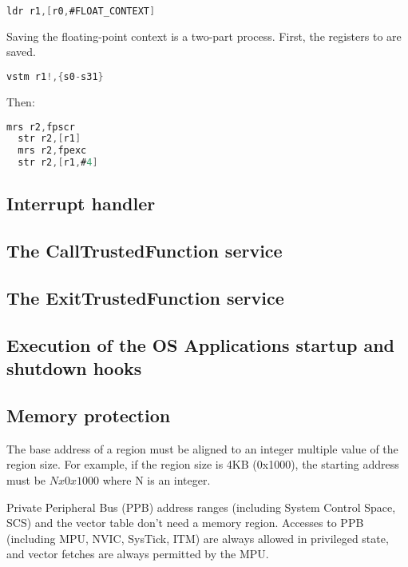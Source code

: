\begin{lstlisting}[language=C]
  ldr r1,[r0,#FLOAT_CONTEXT]
\end{lstlisting}

Saving the floating-point context is a two-part process. First, the registers  to  are saved.


\begin{lstlisting}[language=C]
  vstm r1!,{s0-s31}
\end{lstlisting}

Then:

\begin{lstlisting}[language=C]
  mrs r2,fpscr
  str r2,[r1]
  mrs r2,fpexc
  str r2,[r1,#4]
\end{lstlisting}



\subsection{Interrupt handler}

\subsection{The CallTrustedFunction service}
\subsection{The ExitTrustedFunction service}
\subsection{Execution of the OS Applications startup and shutdown hooks}
\subsection{Memory protection}

The base address of a region must be aligned to an integer multiple value of the region size.
For example, if the region size is 4KB (0x1000), the starting address must be $N x 0x1000$ where N is an integer.

Private Peripheral Bus (PPB) address ranges (including System Control Space, SCS) and the vector table don't need a memory region.
Accesses to PPB (including MPU, NVIC, SysTick, ITM) are always allowed in privileged state, and vector fetches are always permitted by the MPU.

